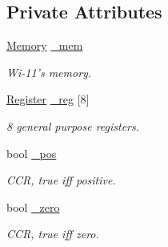 \subsection*{Private Attributes}
\begin{DoxyCompactItemize}
\item 
\hypertarget{classWi11_a4eb624a34718b061c5d1a9704e1511cb}{
\hyperlink{classMemory}{Memory} \hyperlink{classWi11_a4eb624a34718b061c5d1a9704e1511cb}{\_\-mem}}
\label{classWi11_a4eb624a34718b061c5d1a9704e1511cb}

\begin{DoxyCompactList}\small\item\em Wi-\/11's memory. \item\end{DoxyCompactList}\item 
\hypertarget{classWi11_a5db0201cfce46192ffa48e0e7d8661c2}{
\hyperlink{classRegister}{Register} \hyperlink{classWi11_a5db0201cfce46192ffa48e0e7d8661c2}{\_\-reg} \mbox{[}8\mbox{]}}
\label{classWi11_a5db0201cfce46192ffa48e0e7d8661c2}

\begin{DoxyCompactList}\small\item\em 8 general purpose registers. \item\end{DoxyCompactList}\item 
\hypertarget{classWi11_a78b431105c8d82444b3c94401e0e0977}{
bool \hyperlink{classWi11_a78b431105c8d82444b3c94401e0e0977}{\_\-pos}}
\label{classWi11_a78b431105c8d82444b3c94401e0e0977}

\begin{DoxyCompactList}\small\item\em CCR, true iff positive. \item\end{DoxyCompactList}\item 
\hypertarget{classWi11_a2d23fc7d842995772d7f3280f900ca4a}{
bool \hyperlink{classWi11_a2d23fc7d842995772d7f3280f900ca4a}{\_\-zero}}
\label{classWi11_a2d23fc7d842995772d7f3280f900ca4a}

\begin{DoxyCompactList}\small\item\em CCR, true iff zero. \item\end{DoxyCompactList}\end{DoxyCompactItemize}


